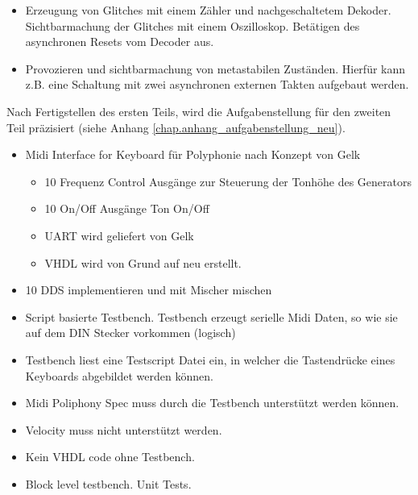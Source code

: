 \begin{itemize}
	\item Erzeugung von Glitches mit einem Zähler und nachgeschaltetem Dekoder. Sichtbarmachung der Glitches mit einem Oszilloskop. Betätigen des asynchronen Resets vom Decoder aus.

	\item Provozieren und sichtbarmachung von metastabilen Zuständen. Hierfür kann z.B. eine Schaltung mit zwei asynchronen externen Takten aufgebaut werden.
\end{itemize}  


Nach Fertigstellen des ersten Teils, wird die Aufgabenstellung für den zweiten Teil präzisiert (siehe Anhang \ref{chap.anhang_aufgabenstellung_neu}).

\begin{itemize}
\item Midi Interface for Keyboard für Polyphonie nach Konzept von Gelk
\begin{itemize}
    \item 10 Frequenz Control Ausgänge zur Steuerung der Tonhöhe des Generators
    \item 10 On/Off Ausgänge Ton On/Off
    \item UART wird geliefert von Gelk
    \item VHDL wird von Grund auf neu erstellt.
\end{itemize}
\item 10 DDS implementieren und mit Mischer mischen
\item Script basierte Testbench. Testbench erzeugt serielle Midi Daten, so wie sie auf dem DIN Stecker vorkommen (logisch)
\item Testbench liest eine Testscript Datei ein, in welcher die Tastendrücke eines Keyboards abgebildet werden können. 
\item Midi Poliphony Spec muss durch die Testbench unterstützt werden können. 
\item Velocity muss nicht unterstützt werden.
\item Kein VHDL code ohne Testbench.
\item Block level testbench. Unit Tests.
\end{itemize}
